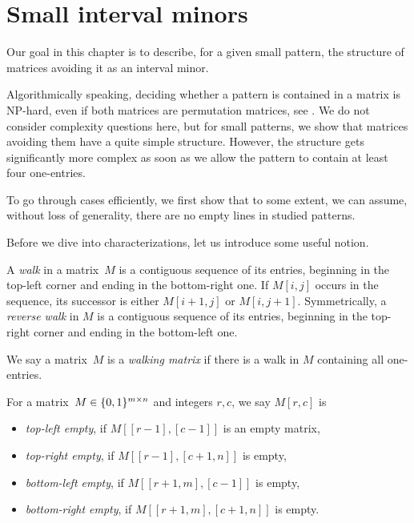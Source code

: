\newsavebox{\smlmat}
\savebox{\smlmat}{$\smm{\bullet&\bullet\\\bullet& }$}
\newsavebox{\smlmatb}
\savebox{\smlmatb}{$\smm{\bullet&\bullet\\\bullet&\bullet}$}
\newsavebox{\smlmatc}
\savebox{\smlmatc}{$\smm{\bullet&\bullet&\bullet\\ &\bullet& }$}

\chapter{Small interval minors}
\label{chap:chars}
Our goal in this chapter is to describe, for a given small pattern, the structure of matrices avoiding it as an interval minor.

Algorithmically speaking, deciding whether a pattern is contained in a matrix is NP-hard, even if both matrices are permutation matrices, see \cite{complex}. We do not consider complexity questions here, but for small patterns, we show that matrices avoiding them have a quite simple structure. However, the structure gets significantly more complex as soon as we allow the pattern to contain at least four one-entries.

To go through cases efficiently, we first show that to some extent, we can assume, without loss of generality, there are no empty lines in studied patterns.

Before we dive into characterizations, let us introduce some useful notion.

\begin{defn}
A \emph{walk} in a matrix~$M$ is a contiguous sequence of its entries, beginning in the top-left corner and ending in the bottom-right one. If $M[i,j]$ occurs in the sequence, its successor is either $M[i+1,j]$ or $M[i,j+1]$. Symmetrically, a \emph{reverse walk} in $M$ is a contiguous sequence of its entries, beginning in the top-right corner and ending in the bottom-left one.
\end{defn}

\begin{defn}
We say a matrix~$M$ is a \emph{walking matrix} if there is a walk in $M$ containing all one-entries.
\end{defn}

\begin{defn}
For a matrix~$M\in\{0,1\}^{m\times n}$ and integers $r,c$, we say $M[r,c]$ is
\begin{itemize}
	\item \emph{top-left empty}, if $M[[r-1],[c-1]]$ is an empty matrix,
	\item \emph{top-right empty}, if $M[[r-1],[c+1,n]]$ is empty,
	\item \emph{bottom-left empty}, if $M[[r+1,m],[c-1]]$ is empty,
	\item \emph{bottom-right empty}, if $M[[r+1,m],[c+1,n]]$ is empty.
\end{itemize}
\end{defn}

